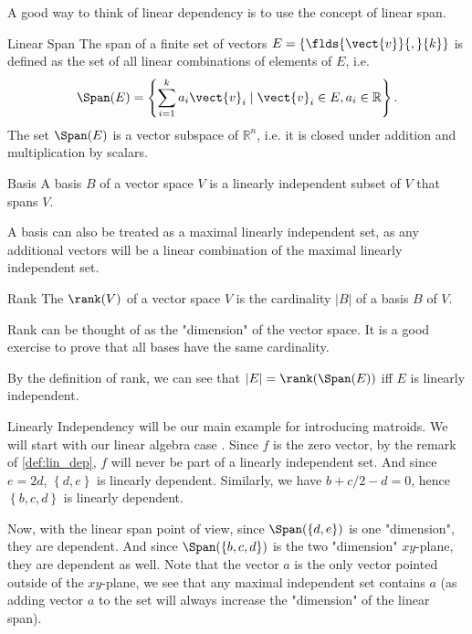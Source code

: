 \documentclass[a4paper,10pt]{article}
\begin{document}
A good way to think of linear dependency is to use the concept of linear span.

\begin{definition}[def:]{Linear Span}
  The span of a finite set of vectors $E=\left\{\flds{\vect{v}}{,}{k}\right\}$ is defined as the set of all linear combinations of elements of $E$, i.e.
  \[
    \Span(E)=\left\{\sum_{i=1}^{k}a_i\vect{v}_i\mid \vect{v}_i\in E,a_i\in \mathbb{R}\right\}.
  \]
  The set $\Span(E)$ is a vector subspace of $\mathbb{R}^n$, i.e. it is closed under addition and multiplication by scalars.
\end{definition}

\begin{definition}[def:]{Basis}
  A basis $B$ of a vector space $V$ is a linearly independent subset of $V$ that spans $V$. 
  \begin{remark}
    A basis can also be treated as a maximal linearly independent set, as any additional vectors will be a linear combination of the maximal linearly independent set.
  \end{remark}
\end{definition}

\begin{definition}[def:]{Rank}
  The $\rank(V)$ of a vector space $V$ is the cardinality $|B|$ of a basis $B$ of $V$.
  \begin{remark}
    Rank can be thought of as the "dimension" of the vector space. It is a good exercise to prove that all bases have the same cardinality.
  \end{remark}
  \begin{remark}
    By the definition of rank, we can see that $|E|=\rank(\Span(E))$ iff $E$ is linearly independent.
  \end{remark}
\end{definition}

\begin{example}{Linearly Independency}
   will be our main example for introducing matroids. We will start with our linear algebra case .
  Since $f$ is the zero vector, by the remark of \cref{def:lin_dep}, $f$ will never be part of a linearly independent set. And since $e=2d$, $\left\{d,e\right\}$ is linearly dependent. Similarly, we have $b+c/2-d=0$, hence $\left\{b,c,d\right\}$ is linearly dependent.

  Now, with the linear span point of view, since $\Span(\{d,e\})$ is one "dimension", they are dependent. And since $\Span(\{b,c,d\})$ is the two "dimension" $xy$-plane, they are dependent as well. Note that the vector $a$ is the only vector pointed outside of the $xy$-plane, we see that any maximal independent set contains $a$ (as adding vector $a$ to the set will always increase the "dimension" of the linear span).
\end{example}
\end{document}
